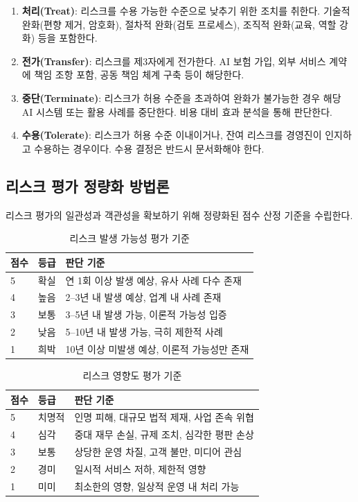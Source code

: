 \begin{enumerate}
 \item \textbf{처리(Treat)}: 리스크를 수용 가능한 수준으로 낮추기 위한 조치를 취한다. 기술적 완화(편향 제거, 암호화), 절차적 완화(검토 프로세스), 조직적 완화(교육, 역할 강화) 등을 포함한다.
 \item \textbf{전가(Transfer)}: 리스크를 제3자에게 전가한다. AI 보험 가입, 외부 서비스 계약에 책임 조항 포함, 공동 책임 체계 구축 등이 해당한다.
 \item \textbf{중단(Terminate)}: 리스크가 허용 수준을 초과하여 완화가 불가능한 경우 해당 AI 시스템 또는 활용 사례를 중단한다. 비용 대비 효과 분석을 통해 판단한다.
 \item \textbf{수용(Tolerate)}: 리스크가 허용 수준 이내이거나, 잔여 리스크를 경영진이 인지하고 수용하는 경우이다. 수용 결정은 반드시 문서화해야 한다.
\end{enumerate}

\subsection{리스크 평가 정량화 방법론}
\label{sec:5.3.5}

리스크 평가의 일관성과 객관성을 확보하기 위해 정량화된 점수 산정 기준을 수립한다.

\begin{table}[htbp]
\centering
\caption{리스크 발생 가능성 평가 기준}
\label{tab:likelihood_criteria}
\begin{tabularx}{\textwidth}{p{1cm}p{2cm}X}
\toprule
\textbf{점수} & \textbf{등급} & \textbf{판단 기준} \\
\midrule
5 & 확실 & 연 1회 이상 발생 예상, 유사 사례 다수 존재 \\
4 & 높음 & 2--3년 내 발생 예상, 업계 내 사례 존재 \\
3 & 보통 & 3--5년 내 발생 가능, 이론적 가능성 입증 \\
2 & 낮음 & 5--10년 내 발생 가능, 극히 제한적 사례 \\
1 & 희박 & 10년 이상 미발생 예상, 이론적 가능성만 존재 \\
\bottomrule
\end{tabularx}
\end{table}

\begin{table}[htbp]
\centering
\caption{리스크 영향도 평가 기준}
\label{tab:impact_criteria}
\begin{tabularx}{\textwidth}{p{1cm}p{2cm}X}
\toprule
\textbf{점수} & \textbf{등급} & \textbf{판단 기준} \\
\midrule
5 & 치명적 & 인명 피해, 대규모 법적 제재, 사업 존속 위협 \\
4 & 심각 & 중대 재무 손실, 규제 조치, 심각한 평판 손상 \\
3 & 보통 & 상당한 운영 차질, 고객 불만, 미디어 관심 \\
2 & 경미 & 일시적 서비스 저하, 제한적 영향 \\
1 & 미미 & 최소한의 영향, 일상적 운영 내 처리 가능 \\
\bottomrule
\end{tabularx}
\end{table}

